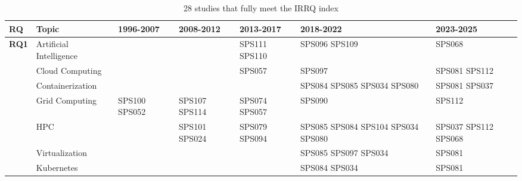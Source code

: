 \begin{table*}[htbp]
	\centering
	\caption{28 studies that fully meet the IRRQ index}
	\label{table:highest_IRRQ}
	\renewcommand{\arraystretch}{1.2}
	\setlength{\tabcolsep}{6pt}
	\begin{tabularx}{\textwidth}{p{0.8cm}p{2.5cm}>{\raggedright\arraybackslash}X>{\raggedright\arraybackslash}X>{\raggedright\arraybackslash}X>{\raggedright\arraybackslash}X>{\raggedright\arraybackslash}X}
		\toprule
		\textbf{RQ}                          & \textbf{Topic}          & \textbf{1996-2007} & \textbf{2008-2012}   & \textbf{2013-2017}          & \textbf{2018-2022}                               & \textbf{2023-2025}          \\
		\midrule
		\multirow{12}{*}[0em]{\textbf{RQ1}}  & Artificial Intelligence &                    &                      & SPS111 SPS110               & SPS096 SPS109                                    & SPS068                      \\
		\addlinespace[0.3em]
		                                     & Cloud Computing         &                    &                      & SPS057                      & SPS097                                           & SPS081 SPS112               \\
		\addlinespace[0.3em]
		                                     & Containerization        &                    &                      &                             & SPS084 SPS085 SPS034 SPS080                      & SPS081 SPS037               \\
		\addlinespace[0.3em]
		                                     & Grid Computing          & SPS100 SPS052      & SPS107 SPS114        & SPS074 SPS057               & SPS090                                           & SPS112                      \\
		\addlinespace[0.3em]
		                                     & HPC                     &                    & SPS101 SPS024        & SPS079 SPS094               & SPS085 SPS084 SPS104 SPS034 SPS080               & SPS037 SPS112 SPS068        \\
		\addlinespace[0.3em]
		                                     & Virtualization          &                    &                      &                             & SPS085 SPS097 SPS034                             & SPS081                      \\
		\addlinespace[0.3em]
		                                     & Kubernetes              &                    &                      &                             & SPS084 SPS034                                    & SPS081                      \\

\end{tabularx}
\end{table*}
